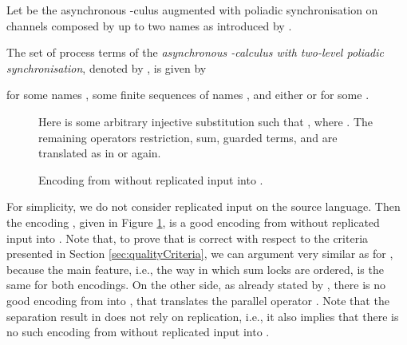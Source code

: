 \documentclass[]{llncs}
\begin{document}
Let  be the asynchronous \piCal-culus augmented with poliadic synchronisation on channels composed by up to two names as introduced by \cite{carboneMaffeis03}.

\begin{definition}[]
  The set of process terms of the \emph{asynchronous \piCal-calculus with two-level poliadic synchronisation}, denoted by , is given by
	
	for some names , some finite sequences of names , and either  or  for some .
\end{definition}

\begin{figure}[htp]
	
	\begin{center}
		Here  is some arbitrary injective substitution such that , where . The remaining operators restriction, sum,  guarded terms, and  are translated as in  or  again.
	\end{center}
	\caption{Encoding  from \piMix without replicated input into .} \label{fig:encodingMixAsynTwo}
\end{figure}

For simplicity, we do not consider replicated input on the source language. Then the encoding , given in Figure \ref{fig:encodingMixAsynTwo}, is a good encoding from \piMix without replicated input into \piAsynTwo. Note that, to prove that  is correct with respect to the criteria presented in Section \ref{sec:qualityCriteria}, we can argument very similar as for , because the main feature, i.e., the way in which sum locks are ordered, is the same for both encodings. On the other side, as already stated by \cite{carboneMaffeis03}, there is no good encoding from \piMix into \piAsynTwo, that translates the parallel operator \cleanly. Note that the separation result in \cite{carboneMaffeis03} does not rely on replication, i.e., it also implies that there is no such encoding from \piMix without replicated input into \piAsynTwo.



\end{document}
